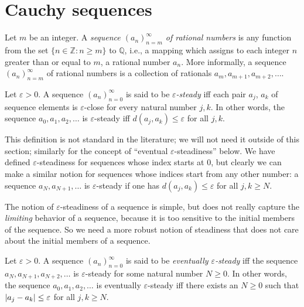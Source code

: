 \section{Cauchy sequences}\label{sec 5.1}

\begin{definition}[Sequences]\label{5.1.1}
Let \(m\) be an integer.
A \emph{sequence \((a_n)_{n = m}^{\infty}\) of rational numbers} is any function from the set \(\{n \in \mathds{Z} : n \geq m\}\) to \(\mathds{Q}\), i.e., a mapping which assigns to each integer \(n\) greater than or equal to \(m\), a rational number \(a_n\).
More informally, a sequence \((a_n)_{n = m}^{\infty}\) of rational numbers is a collection of rationals \(a_m, a_{m + 1}, a_{m + 2}, \dots\).
\end{definition}

\setcounter{theorem}{2}
\begin{definition}\label{5.1.3}
Let \(\varepsilon > 0\).
A sequence \((a_n)_{n = 0}^{\infty}\) is said to be \emph{\(\varepsilon\)-steady} iff each pair \(a_j\), \(a_k\) of sequence elements is \(\varepsilon\)-close for every natural number \(j, k\).
In other words, the sequence \(a_0, a_1, a_2, \dots\) is \(\varepsilon\)-steady iff \(d(a_j, a_k) \leq \varepsilon\) for all \(j, k\).
\end{definition}

\begin{remark}\label{5.1.4}
This definition is not standard in the literature;
we will not need it outside of this section;
similarly for the concept of ``eventual \(\varepsilon\)-steadiness'' below.
We have defined \(\varepsilon\)-steadiness for sequences whose index starts at \(0\), but clearly we can make a similar notion for sequences whose indices start from any other number:
a sequence \(a_N, a_{N + 1}, \dots\) is \(\varepsilon\)-steady if one has \(d(a_j, a_k) \leq \varepsilon\) for all \(j, k \geq N\).
\end{remark}

\begin{note}
The notion of \(\varepsilon\)-steadiness of a sequence is simple, but does not really capture the \emph{limiting} behavior of a sequence, because it is too sensitive to the initial members of the sequence.
So we need a more robust notion of steadiness that does not care about the initial members of a sequence.
\end{note}

\setcounter{theorem}{5}
\begin{definition}\label{5.1.6}
Let \(\varepsilon > 0\).
A sequence \((a_n)_{n = 0}^{\infty}\) is said to be \emph{eventually \(\varepsilon\)-steady} iff the sequence \(a_N, a_{N + 1}, a_{N + 2}, \dots\) is \(\varepsilon\)-steady for some natural number \(N \geq 0\).
In other words, the sequence \(a_0, a_1, a_2, \dots\) is eventually \(\varepsilon\)-steady iff there exists an \(N \geq 0\) such that \(\abs*{a_j - a_k} \leq \varepsilon\) for all \(j, k \geq N\).
\end{definition}

